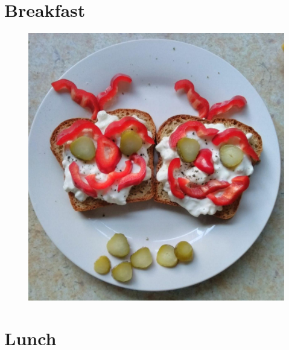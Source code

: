 \documentclass[%
titlepage,
b5paper,
twoside,
11pt
]{book}
\begin{document}
\chapter{Breakfast}
\begin{figure}[h]
	\centering
	\includegraphics[width=\textwidth]{pic/breakfast}
\end{figure}


\newpage

\newpage

\newpage

\newpage

\newpage

\newpage

\chapter{Lunch}
\end{document}
